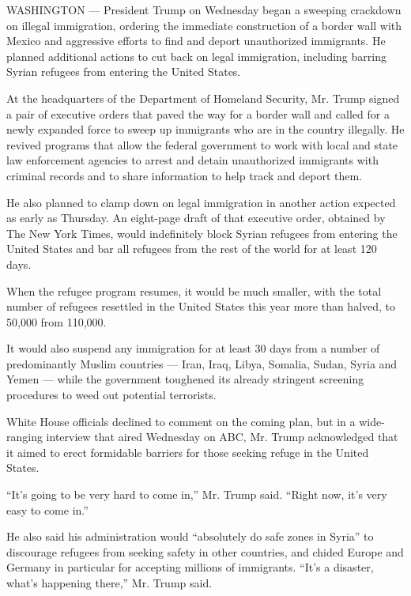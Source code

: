 WASHINGTON --- President Trump on Wednesday began a sweeping crackdown
on illegal immigration, ordering the immediate construction of a border
wall with Mexico and aggressive efforts to find and deport unauthorized
immigrants. He planned additional actions to cut back on legal
immigration, including barring Syrian refugees from entering the United
States.

At the headquarters of the Department of Homeland Security, Mr. Trump
signed a pair of executive orders that paved the way for a border wall
and called for a newly expanded force to sweep up immigrants who are in
the country illegally. He revived programs that allow the federal
government to work with local and state law enforcement agencies to
arrest and detain unauthorized immigrants with criminal records and to
share information to help track and deport them.

He also planned to clamp down on legal immigration in another action
expected as early as Thursday. An eight-page draft of that executive
order, obtained by The New York Times, would indefinitely block Syrian
refugees from entering the United States and bar all refugees from the
rest of the world for at least 120 days.

When the refugee program resumes, it would be much smaller, with the
total number of refugees resettled in the United States this year more
than halved, to 50,000 from 110,000.

It would also suspend any immigration for at least 30 days from a number
of predominantly Muslim countries --- Iran, Iraq, Libya, Somalia, Sudan,
Syria and Yemen --- while the government toughened its already stringent
screening procedures to weed out potential terrorists.

White House officials declined to comment on the coming plan, but in a
wide-ranging interview that aired Wednesday on ABC, Mr. Trump
acknowledged that it aimed to erect formidable barriers for those
seeking refuge in the United States.

``It's going to be very hard to come in,'' Mr. Trump said. ``Right now,
it's very easy to come in.''

He also said his administration would ``absolutely do safe zones in
Syria'' to discourage refugees from seeking safety in other countries,
and chided Europe and Germany in particular for accepting millions of
immigrants. ``It's a disaster, what's happening there,'' Mr. Trump said.

\href{https://www.nytimes3xbfgragh.onion/interactive/2017/01/25/us/politics/document-Trump-EO-Draft-on-Refugees.html}{}

